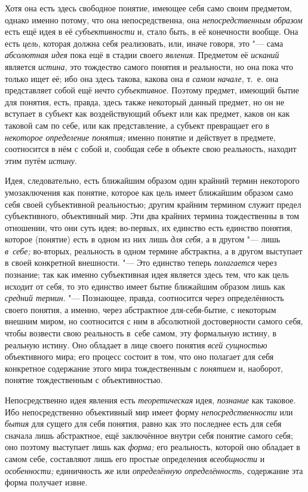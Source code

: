 Хотя она есть здесь свободное понятие, имеющее себя само своим
предметом, однако именно потому, что она непосредственна, она
{\em непосредственным образом}
есть ещё идея в её
{\em субъективности} и,
стало быть, в её конечности вообще. Она есть
{\em цель,} которая
должна себя реализовать, или, иначе говоря, это "--- сама
{\em абсолютная идея}
пока ещё в стадии своего
{\em явления}. Предметом
её {\em исканий} является
{\em истина,} это
тождество самого понятия и реальности, но она пока что только ищет её; ибо
она здесь такова, какова она {\em в
самом начале,} т.~е. она представляет собой ещё нечто
{\em субъективное}.
Поэтому предмет, имеющий бытие для понятия, есть, правда,
здесь также некоторый данный предмет, но он не вступает в субъект как
воздействующий объект или как предмет, каков он как таковой сам по себе,
или как представление, а субъект превращает его в
{\em некоторое определение понятия;}
именно понятие и действует в предмете, соотносится в нём с собой
и, сообщая себе в объекте свою реальность, находит этим путём {\em истину}.

Идея, следовательно, есть ближайшим образом один крайний
термин некоторого умозаключения как понятие, которое как цель имеет
ближайшим образом само себя своей субъективной реальностью; другим крайним
термином служит предел субъективного, объективный мир. Эти два крайних
термина тождественны в том отношении, что они суть идея; во-первых, их
единство есть единство понятия, которое (понятие) есть в одном из них лишь
{\em для себя,} а в другом "--- лишь {\em в~себе;}
во-вторых, реальность в одном термине абстрактна, а в другом
выступает в своей конкретной внешности. "--- Это
единство теперь {\em полагается}
через познание; так как именно субъективная идея является
здесь тем, что как цель исходит от себя, то это единство имеет бытие
ближайшим образом лишь как {\em средний
термин}. "--- Познающее, правда, соотносится через
определённость своего понятия, а именно, через абстрактное
для-себя-бытие, с некоторым внешним миром, но соотносится с
ним в абсолютной достоверности самого себя, чтобы возвести свою реальность
в~себе самом, эту формальную истину, в реальную истину. Оно обладает в лице
своего понятия {\em всей сущностью}
объективного мира; его процесс состоит в том, что оно
полагает для себя конкретное содержание этого мира тождественным с
{\em понятием} и,
наоборот, понятие тождественным с объективностью.

Непосредственно идея явления есть
{\em теоретическая} идея,
{\em познание} как
таковое. Ибо непосредственно объективный мир имеет форму
{\em непосредственности}
или {\em бытия}
для сущего для себя понятия, равно как это последнее есть для
себя сначала лишь абстрактное, ещё заключённое внутри себя понятие самого
себя; оно поэтому выступает лишь как {\em форма;} его
реальность, которой оно обладает в самом себе, составляют лишь его простые
определения {\em всеобщности} и {\em особенности;} единичность же или
{\em определённую определённость,} содержание эта форма получает извне.

